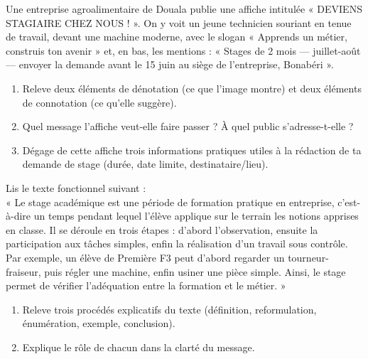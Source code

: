 \documentclass[11pt]{article}
\newcommand{\cle}[1]{{\popxbold\color{popdark}#1}}
\newcounter{popsec}
\newcounter{popsub}
\newcommand{\courssub}[1]{%
  \stepcounter{popsub}%
  \par\vspace{9pt}\noindent{\popxbold\fontsize{11.5}{13}\selectfont\color{popink}{\color{poporange}\thepopsec.\thepopsub}\hspace{6pt}#1}\par\nopagebreak\vspace{4pt}
}
\begin{document}
\begin{exercice}
Une entreprise agroalimentaire de Douala publie une affiche intitulée « DEVIENS STAGIAIRE CHEZ NOUS ! ». On y voit un jeune technicien souriant en tenue de travail, devant une machine moderne, avec le slogan « Apprends un métier, construis ton avenir » et, en bas, les mentions : « Stages de 2 mois --- juillet-août --- envoyer la demande avant le 15 juin au siège de l'entreprise, Bonabéri ».
\begin{enumerate}
\item Releve deux éléments de \cle{dénotation} (ce que l'image montre) et deux éléments de \cle{connotation} (ce qu'elle suggère).
\item Quel message l'affiche veut-elle faire passer ? À quel public s'adresse-t-elle ?
\item Dégage de cette affiche trois informations pratiques utiles à la rédaction de ta demande de stage (durée, date limite, destinataire/lieu).
\end{enumerate}
\end{exercice}

\begin{exercice}
Lis le texte fonctionnel suivant :\\
« Le stage académique est une période de formation pratique en entreprise, c'est-à-dire un temps pendant lequel l'élève applique sur le terrain les notions apprises en classe. Il se déroule en trois étapes : d'abord l'observation, ensuite la participation aux tâches simples, enfin la réalisation d'un travail sous contrôle. Par exemple, un élève de Première F3 peut d'abord regarder un tourneur-fraiseur, puis régler une machine, enfin usiner une pièce simple. Ainsi, le stage permet de vérifier l'adéquation entre la formation et le métier. »
\begin{enumerate}
\item Releve trois procédés explicatifs du texte (définition, reformulation, énumération, exemple, conclusion).
\item Explique le rôle de chacun dans la clarté du message.
\end{enumerate}
\end{exercice}

\courssub{Je me prépare au Bac}
\end{document}
